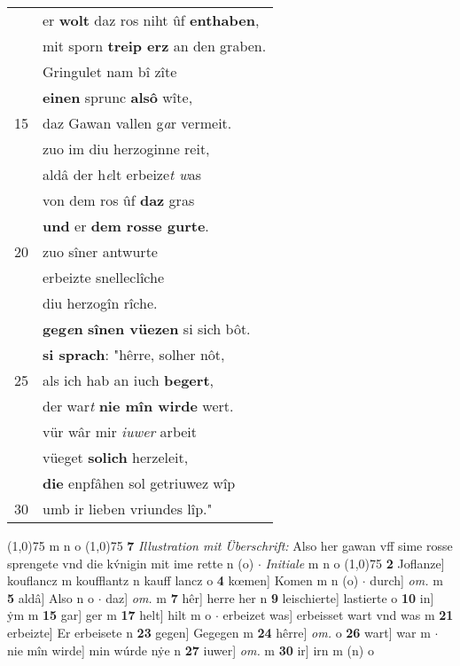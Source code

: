 \documentclass[8pt,a4paper,notitlepage]{article}
\begin{document}
\begin{table}[ht]
\begin{minipage}[t]{0.5\linewidth}
\begin{tabular}{rl}
 & er \textbf{wolt} daz ros niht ûf \textbf{enthaben},\\ 
 & mit sporn \textbf{treip erz} an den graben.\\ 
 & Gringulet nam bî zîte\\ 
 & \textbf{einen} sprunc \textbf{alsô} wîte,\\ 
15 & daz Gawan vallen g\textit{a}r vermeit.\\ 
 & zuo im diu herzoginne reit,\\ 
 & aldâ der h\textit{e}lt erbeize\textit{t w}as\\ 
 & von dem ros ûf \textbf{daz} gras\\ 
 & \textbf{und} er \textbf{dem rosse gurte}.\\ 
20 & zuo sîner antwurte\\ 
 & erbeizte snelleclîche\\ 
 & diu herzogîn rîche.\\ 
 & \textbf{geg\textit{e}n} \textbf{sînen vüezen} si sich bôt.\\ 
 & \textbf{si sprach}: "hêrre, solher nôt,\\ 
25 & als ich hab an iuch \textbf{begert},\\ 
 & der war\textit{t} \textbf{nie mîn wirde} wert.\\ 
 & vür wâr mir \textit{iuwer} arbeit\\ 
 & vüeget \textbf{solich} herzeleit,\\ 
 & \textbf{die} enpfâhen sol getriuwez wîp\\ 
30 & umb ir lieben vriundes lîp."\\ 
\end{tabular}
\scriptsize
\line(1,0){75} \newline
m n o \newline
\line(1,0){75} \newline
\textbf{7} \textit{Illustration mit Überschrift:} Also her gawan vff sime rosse sprengete vnd die kv́nigin mit ime rette n (o)   $\cdot$ \textit{Initiale} m n o  \newline
\line(1,0){75} \newline
\textbf{2} Joflanze] kouflancz m koufflantz n kauff lancz o \textbf{4} kœmen] Komen m n (o)  $\cdot$ durch] \textit{om.} m \textbf{5} aldâ] Also n o  $\cdot$ daz] \textit{om.} m \textbf{7} hêr] herre her n \textbf{9} leischierte] lastierte o \textbf{10} in] ẏm m \textbf{15} gar] ger m \textbf{17} helt] hilt m o  $\cdot$ erbeizet was] erbeisset wart vnd was m \textbf{21} erbeizte] Er erbeisete n \textbf{23} gegen] Gegegen m \textbf{24} hêrre] \textit{om.} o \textbf{26} wart] war m  $\cdot$ nie mîn wirde] min wúrde nẏe n \textbf{27} iuwer] \textit{om.} m \textbf{30} ir] irn m (n) o \newline
\end{minipage}
\end{table}
\end{document}
